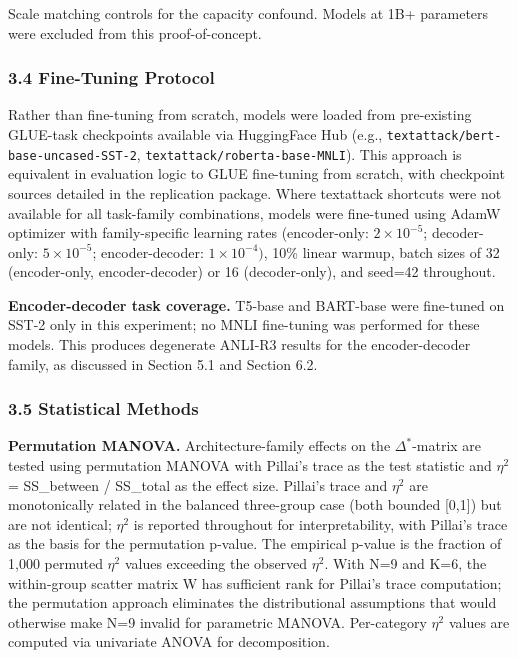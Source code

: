 Scale matching controls for the capacity confound. Models at 1B+ parameters were excluded from this proof-of-concept.

\subsubsection{3.4 Fine-Tuning Protocol}

Rather than fine-tuning from scratch, models were loaded from pre-existing GLUE-task checkpoints available via HuggingFace Hub (e.g., \texttt{textattack/bert-base-uncased-SST-2}, \texttt{textattack/roberta-base-MNLI}). This approach is equivalent in evaluation logic to GLUE fine-tuning from scratch, with checkpoint sources detailed in the replication package. Where textattack shortcuts were not available for all task-family combinations, models were fine-tuned using AdamW optimizer with family-specific learning rates (encoder-only: $2\times 10^{-5}$; decoder-only: $5\times 10^{-5}$; encoder-decoder: $1\times 10^{-4})$, 10\% linear warmup, batch sizes of 32 (encoder-only, encoder-decoder) or 16 (decoder-only), and seed=42 throughout.

\textbf{Encoder-decoder task coverage.} T5-base and BART-base were fine-tuned on SST-2 only in this experiment; no MNLI fine-tuning was performed for these models. This produces degenerate ANLI-R3 results for the encoder-decoder family, as discussed in Section 5.1 and Section 6.2.

\subsubsection{3.5 Statistical Methods}

\textbf{Permutation MANOVA.} Architecture-family effects on the $\Delta^*$-matrix are tested using permutation MANOVA with Pillai's trace as the test statistic and $\eta^2$ = SS\_between / SS\_total as the effect size. Pillai's trace and $\eta^2$ are monotonically related in the balanced three-group case (both bounded [0,1]) but are not identical; $\eta^2$ is reported throughout for interpretability, with Pillai's trace as the basis for the permutation p-value. The empirical p-value is the fraction of 1,000 permuted $\eta^2$ values exceeding the observed $\eta^2$. With N=9 and K=6, the within-group scatter matrix W has sufficient rank for Pillai's trace computation; the permutation approach eliminates the distributional assumptions that would otherwise make N=9 invalid for parametric MANOVA. Per-category $\eta^2$ values are computed via univariate ANOVA for decomposition.

